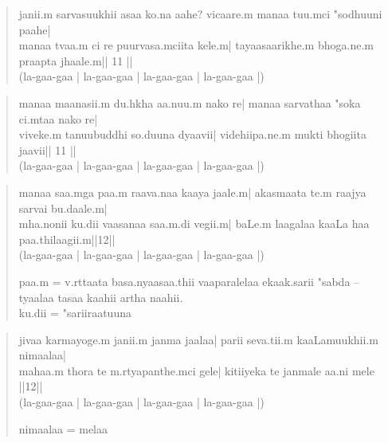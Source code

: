 \documentclass[a6paper]{article}
\begin{document}
    \begin{verse}
        janii.m sarvasuukhii asaa ko.na aahe?
        vicaare.m manaa tuu.mci "sodhuuni paahe|\\

        manaa tvaa.m ci re puurvasa.mciita kele.m|
        tayaasaarikhe.m bhoga.ne.m praapta jhaale.m|| 11 ||\\
        (la-gaa-gaa | la-gaa-gaa | la-gaa-gaa | la-gaa-gaa |)
    \end{verse}
    \begin{verse}
        manaa maanasii.m du.hkha aa.nuu.m nako re|
        manaa sarvathaa "soka ci.mtaa nako re|\\

        viveke.m tanuubuddhi so.duuna dyaavii|
        videhiipa.ne.m mukti bhogiita jaavii|| 11 ||\\
        (la-gaa-gaa | la-gaa-gaa | la-gaa-gaa | la-gaa-gaa |)
    \end{verse}
    \begin{verse}
        manaa saa.mga paa.m raava.naa kaaya jaale.m|
        akasmaata te.m raajya sarvai bu.daale.m|\\

        mha.nonii ku.dii vaasanaa saa.m.di vegii.m|
        baLe.m laagalaa kaaLa haa paa.thilaagii.m||12||\\
        (la-gaa-gaa | la-gaa-gaa | la-gaa-gaa | la-gaa-gaa |)

        paa.m = v.rttaata basa.nyaasaa.thii vaaparalelaa ekaak.sarii "sabda -- tyaalaa tasaa kaahii artha naahii.\\
        ku.dii = "sariiraatuuna
    \end{verse}
    \begin{verse}
        jivaa karmayoge.m janii.m janma jaalaa|
        parii seva.tii.m kaaLamuukhii.m nimaalaa|\\

        mahaa.m thora te m.rtyapanthe.mci gele|
        kitiiyeka te janmale aa.ni mele ||12||\\
        (la-gaa-gaa | la-gaa-gaa | la-gaa-gaa | la-gaa-gaa |)

        nimaalaa = melaa \\
    \end{verse}
\end{document}

